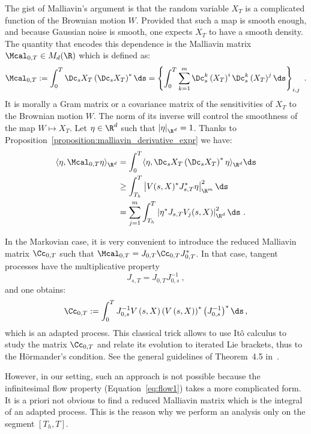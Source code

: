 The gist of Malliavin's argument is that the random variable $X_T$ is a complicated function of the Brownian motion $W$. Provided that such a map is smooth enough, and because Gaussian noise is smooth, one expects $X_T$ to have a smooth density. The quantity that encodes this dependence is the Malliavin matrix $\Mcal_{0,T} \in M_d(\R)$ which is defined as:
\begin{equation}\label{eq:malliavin_matrix}
\Mcal_{0,T}:=  \int_0^T \Dc_s X_T \left(\Dc_s X_T \right)^* \ds=\left\{ \int_0^T \sum_{k=1}^m \Dc_s^k \left(X_T\right)^i \Dc_s^k \left(X_T\right)^j \ds\right\}_{i,j}\ .
\end{equation}
It is morally a Gram matrix or a covariance matrix of the sensitivities of $X_T$ to the Brownian motion $W$. The norm of its inverse will control the smoothness of the map $W \mapsto X_T$. Let $\eta \in \R^d$ such that $\left| \eta \right|_{\R^d}=1$. Thanks to Proposition~\ref{proposition:malliavin_derivative_expr} we have:
\begin{align*}
\langle \eta, \Mcal_{0,T} \eta \rangle_{\R^d} &= \int_0^T \langle \eta, \Dc_s X_T \left(\Dc_s X_T \right)^* \eta \rangle_{\R^d} \ds\\
& \geq \int_{T_h}^T \left| V(s,X)^* J_{s,T}^* \eta \right|_{\R^m}^2 \ds\\
&= \sum_{j=1}^m \int_{T_h}^T \left| \eta^* J_{s,T} V_j(s,X) \right|_{\R^d}^2 \ds \ .
\end{align*}

\begin{rema}
In the Markovian case, it is very convenient to introduce the reduced Malliavin matrix $\Cc_{0,T}$ such that $\Mcal_{0,T} = J_{0,T} \Cc_{0,T} J_{0,T}^*$. In that case, tangent processes have the multiplicative property
\[
J_{s,T} = J_{0,T} J_{0,s}^{-1} \ ,
\]
and one obtains:
\begin{equation}\label{eq:malliavin_matrix_reduced}
\Cc_{0,T} :=  \int_0^T J_{0, s}^{-1} V\left(s, X\right)
\left(V\left(s,X\right) \right)^*
\left(J_{0, s}^{-1} \right)^* \ds \, ,
\end{equation}
which is an adapted process. This classical trick allows to use Itô calculus to study the matrix $\Cc_{0,T}$ and relate its evolution to iterated Lie brackets, thus to the H\"ormander's condition. See the general guidelines of Theorem~4.5 in~\cite{Hairer11}.

However, in our setting, such an approach is not possible because the infinitesimal flow property (Equation~\eqref{eq:flow1}) takes a more complicated form. It is a priori not obvious to find a reduced Malliavin matrix which is the integral of an adapted process. This is the reason why we perform an analysis only on the segment $[T_h, T]$.
\end{rema}

